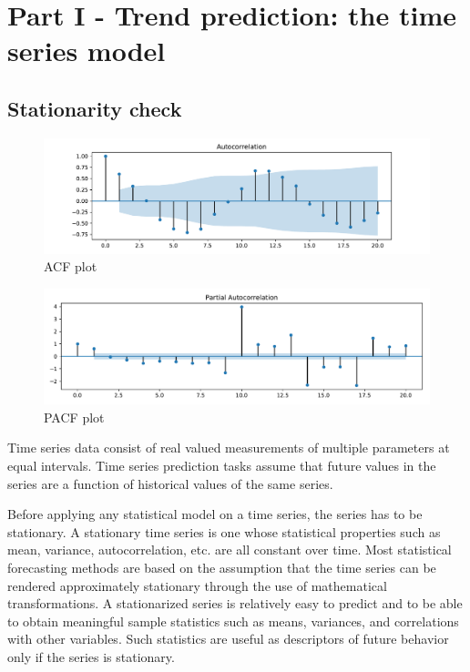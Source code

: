 \documentclass[runningheads]{llncs}
\begin{document}
\section{Part I - Trend prediction: the time series model}

\subsection{Stationarity check}

\begin{figure}
    \includegraphics[width=\textwidth]{Toronto-ACF.pdf}
    \caption{ACF plot}\label{toronto-acf}
\end{figure}

\begin{figure}
    \includegraphics[width=\textwidth]{Toronto-PACF.pdf}
    \caption{PACF plot}\label{toronto-pacf}
\end{figure}

Time series data consist of real valued measurements of multiple parameters at equal intervals. Time series prediction tasks assume that future values in the series are a function of historical values of the same series.

Before applying any statistical model on a time series, the series has to be stationary. A stationary time series is one whose statistical properties such as mean, variance, autocorrelation, etc. are all constant over time. Most statistical forecasting methods are based on the assumption that the time series can be rendered approximately stationary through the use of mathematical transformations. A stationarized series is relatively easy to predict and to be able to obtain meaningful sample statistics such as means, variances, and correlations with other variables. Such statistics are useful as descriptors of future behavior only if the series is stationary. 
\end{document}

